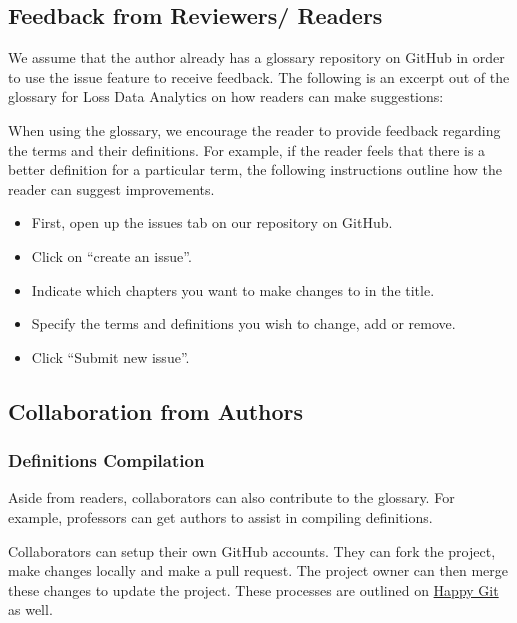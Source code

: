 \documentclass[
]{book}
\providecommand{\tightlist}{%
  \setlength{\itemsep}{0pt}\setlength{\parskip}{0pt}}
\begin{document}
\hypertarget{feedback-from-reviewers-readers}{%
\subsection{Feedback from Reviewers/ Readers}\label{feedback-from-reviewers-readers}}

We assume that the author already has a glossary repository on GitHub in order to use the issue feature to receive feedback. The following is an excerpt out of the glossary for Loss Data Analytics on how readers can make suggestions:

When using the glossary, we encourage the reader to provide feedback regarding the terms and their definitions. For example, if the reader feels that there is a better definition for a particular term, the following instructions outline how the reader can suggest improvements.

\begin{itemize}
\tightlist
\item
  First, open up the issues tab on our repository on GitHub.
\item
  Click on ``create an issue''.
\item
  Indicate which chapters you want to make changes to in the title.
\item
  Specify the terms and definitions you wish to change, add or remove.
\item
  Click ``Submit new issue''.
\end{itemize}

\hypertarget{collaboration-from-authors}{%
\subsection{Collaboration from Authors}\label{collaboration-from-authors}}

\hypertarget{definitions-compilation}{%
\subsubsection{Definitions Compilation}\label{definitions-compilation}}

Aside from readers, collaborators can also contribute to the glossary. For example, professors can get authors to assist in compiling definitions.

Collaborators can setup their own GitHub accounts. They can fork the project, make changes locally and make a pull request. The project owner can then merge these changes to update the project. These processes are outlined on \href{http://happygitwithr.com/fork.html}{Happy Git} as well.
\end{document}
